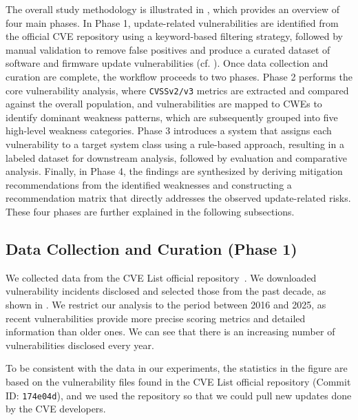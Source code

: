 \documentclass[fleqn,s1,names,tex]{neptune}
\begin{document}
The overall study methodology is illustrated in  , which provides an overview of four main phases.
 In Phase 1, update-related vulnerabilities are identified from the official CVE repository using a keyword-based filtering strategy, followed by manual validation to remove false positives and produce a curated dataset of software and firmware update vulnerabilities (cf. ).
Once data collection and curation are complete, the workflow proceeds to two phases.
Phase 2 performs the core vulnerability analysis, where \texttt{CVSSv2/v3} metrics are extracted and compared against the overall population, and vulnerabilities are mapped to CWEs to identify dominant weakness patterns, which are subsequently grouped into five high-level weakness categories. 
Phase 3 introduces a system that assigns each vulnerability to a target system class using a rule-based approach, resulting in a labeled dataset for downstream analysis, followed by evaluation and comparative analysis. 
Finally, in Phase 4, the findings are synthesized by deriving mitigation recommendations from the identified weaknesses and constructing a recommendation matrix that directly addresses the observed update-related risks.
These four phases are further explained in the following subsections.


\subsection{Data Collection and Curation (\?Phase 1)}


We collected data from the CVE List official
repository~\citep{CVE_Program,CVE_List_V5}.
We downloaded vulnerability incidents disclosed and selected those from the past decade, as shown in  .
We restrict our analysis to the period between 2016 and 2025, as recent vulnerabilities provide more precise scoring metrics and detailed information than older ones.
We can see that there is an increasing number of vulnerabilities disclosed every year.


To be consistent with the data in our experiments, the statistics in the figure are based on the vulnerability files found in the CVE List official repository (Commit ID: \texttt{174e04d}), and we used the repository so that we could pull new updates  done by the CVE developers.

\nosubfloat[1]
\end{document}
